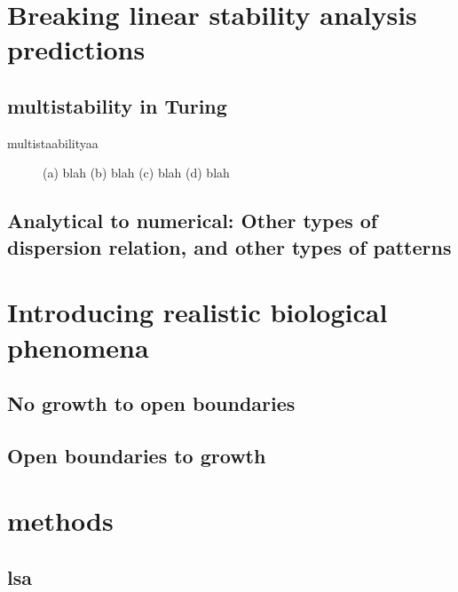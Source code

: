 \section{Breaking linear stability analysis predictions}

\subsection{multistability in Turing}
multistaabilityaa

\begin{adjustbox}{width=1.4\textwidth,center}
\begin{figure}
    \centering
%
    \caption{(a) blah (b) blah (c) blah (d) blah}
    \label{fig:foobar}
\end{figure}
\end{adjustbox}


\subsection{Analytical to numerical: Other types of dispersion relation, and other types of patterns}


\section{Introducing realistic biological phenomena}
\subsection{No growth to open boundaries}
\subsection{Open boundaries to growth}


\section{methods}
\subsection{lsa}

